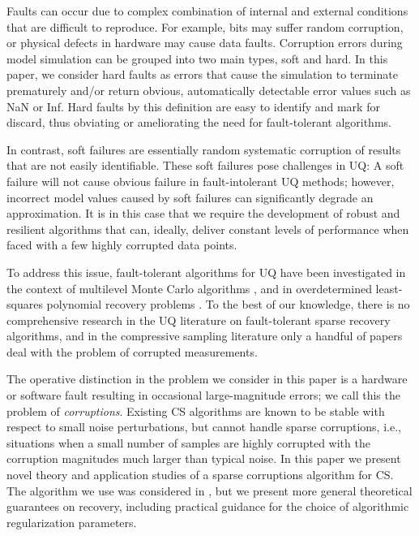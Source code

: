 Faults can occur  due  to complex  combination  of  internal  and  external  conditions  that are difficult to reproduce. For example, bits may suffer random corruption, or physical defects in hardware may cause data faults. Corruption errors during model simulation can be grouped into two main types, soft and hard. In this paper, we consider hard faults as errors that cause the simulation to terminate prematurely and/or return obvious, automatically detectable error values such as NaN or Inf.  Hard faults by this definition are easy to identify and mark for discard, thus obviating or ameliorating the need for fault-tolerant algorithms. 

In contrast, soft failures are essentially random systematic corruption of results that are not easily identifiable. These soft failures pose challenges in UQ: A soft failure  will not cause obvious failure in fault-intolerant UQ methods; however, incorrect model values caused by soft failures can significantly degrade an approximation. It is in this case that we require the development of robust and resilient algorithms that can, ideally, deliver constant levels of performance when faced with a few highly corrupted data points.


To address this issue, fault-tolerant algorithms for UQ have been investigated in the context of multilevel Monte Carlo algorithms \cite{pauli_fault_thesis_2014,pauli_intrinsic_2015,pauli_fault_2014}, and in overdetermined least-squares polynomial recovery problems \cite{shin_correcting_2016}. To the best of our knowledge, there is no comprehensive research in the UQ literature on fault-tolerant sparse recovery algorithms, and in the compressive sampling literature only a handful of papers \cite{LaskaEtAlCorrupt,LiCorruptionsConstrApprox,NguyenTranCorrupt,stankovic_missing_2014,StuderEtAlCorrupt,DSuCSCorruptFourier,DSuCorrupted,WrightMaCorruption} deal with the problem of corrupted measurements.

The operative distinction in the problem we consider in this paper is a hardware or software fault resulting in occasional large-magnitude errors; we call this the problem of \textit{corruptions}. Existing CS algorithms are known to be stable with respect to small noise perturbations, but cannot handle sparse corruptions, i.e., situations when a small number of samples are highly corrupted with the corruption magnitudes much larger than typical noise. In this paper we present novel theory and application studies of a sparse corruptions algorithm for CS. The algorithm we use was considered in \cite{LiCorruptionsConstrApprox}, but we present more general theoretical guarantees on recovery, including practical guidance for the choice of algorithmic regularization parameters. 

